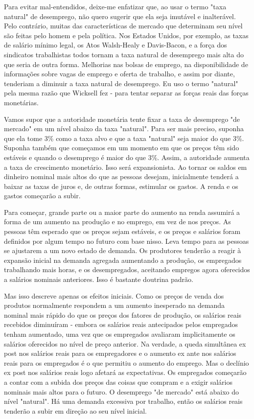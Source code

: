 \documentclass[a4paper,12pt]{article}[abntex2]
\begin{document}
Para evitar mal-entendidos, deixe-me enfatizar que, ao usar o termo "taxa natural" de desemprego, não quero sugerir que ela seja imutável e inalterável. Pelo contrário, muitas das características de mercado que determinam seu nível são feitas pelo homem e pela política. Nos Estados Unidos, por exemplo, as taxas de salário mínimo legal, os Atos Walsh-Healy e Davis-Bacon, e a força dos sindicatos trabalhistas todos tornam a taxa natural de desemprego mais alta do que seria de outra forma. Melhorias nas bolsas de emprego, na disponibilidade de informações sobre vagas de emprego e oferta de trabalho, e assim por diante, tenderiam a diminuir a taxa natural de desemprego. Eu uso o termo "natural" pela mesma razão que Wicksell fez - para tentar separar as forças reais das forças monetárias.

Vamos supor que a autoridade monetária tente fixar a taxa de desemprego "de mercado" em um nível abaixo da taxa "natural". Para ser mais preciso, suponha que ela tome 3\% como a taxa alvo e que a taxa "natural" seja maior do que 3\%. Suponha também que começamos em um momento em que os preços têm sido estáveis e quando o desemprego é maior do que 3\%. Assim, a autoridade aumenta a taxa de crescimento monetário. Isso será expansionista. Ao tornar os saldos em dinheiro nominal mais altos do que as pessoas desejam, inicialmente tenderá a baixar as taxas de juros e, de outras formas, estimular os gastos. A renda e os gastos começarão a subir.

Para começar, grande parte ou a maior parte do aumento na renda assumirá a forma de um aumento na produção e no emprego, em vez de nos preços. As pessoas têm esperado que os preços sejam estáveis, e os preços e salários foram definidos por algum tempo no futuro com base nisso. Leva tempo para as pessoas se ajustarem a um novo estado de demanda. Os produtores tenderão a reagir à expansão inicial na demanda agregada aumentando a produção, os empregados trabalhando mais horas, e os desempregados, aceitando empregos agora oferecidos a salários nominais anteriores. Isso é bastante doutrina padrão.

Mas isso descreve apenas os efeitos iniciais. Como os preços de venda dos produtos normalmente respondem a um aumento inesperado na demanda nominal mais rápido do que os preços dos fatores de produção, os salários reais recebidos diminuíram - embora os salários reais antecipados pelos empregados tenham aumentado, uma vez que os empregados avaliaram implicitamente os salários oferecidos no nível de preço anterior. Na verdade, a queda simultânea ex post nos salários reais para os empregadores e o aumento ex ante nos salários reais para os empregados é o que permitiu o aumento do emprego. Mas o declínio ex post nos salários reais logo afetará as expectativas. Os empregados começarão a contar com a subida dos preços das coisas que compram e a exigir salários nominais mais altos para o futuro. O desemprego "de mercado" está abaixo do nível "natural". Há uma demanda excessiva por trabalho, então os salários reais tenderão a subir em direção ao seu nível inicial.
\end{document}
